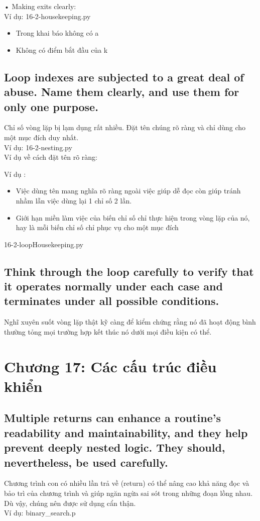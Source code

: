 \documentclass{article}
\begin{document}
    • Making exits clearly:\\
    Ví dụ: 16-2-housekeeping.py
    \begin{itemize}
        \item Trong khai báo không có a
        \item Không có điểm bắt đầu của k   
    \end{itemize}
    
    \subsection{Loop indexes are subjected to a great deal of abuse. Name them clearly, and use them for only one purpose.}
    Chỉ số vòng lặp bị lạm dụng rất nhiều. Đặt tên chúng rõ ràng và chỉ dùng cho một mục đích duy nhất.\\
    Ví dụ: 16-2-nesting.py\\
    Ví dụ về cách đặt tên rõ ràng: 
    
    Ví dụ :
    \begin{itemize}
        \item Việc dùng tên mang nghĩa rõ ràng ngoài việc giúp dễ đọc còn giúp tránh nhầm lẫn việc dùng lại 1 chỉ số 2 lần.
        \item Giới hạn miền làm việc của biến chỉ số chỉ thực hiện trong vòng lặp của nó, hay là mỗi biến chỉ số chỉ phục vụ cho một mục đích
    \end{itemize}
    16-2-loopHousekeeping.py
    
    \subsection{Think through the loop carefully to verify that it operates normally under each case and terminates under all possible conditions.}
    Nghĩ xuyên suốt vòng lặp thật kỹ càng để kiểm chứng rằng nó đã hoạt động bình thường tỏng mọi trường hợp kết thúc nó dưới mọi điều kiện có thể.
    

\section{Chương 17: Các cấu trúc điều khiển}
    \subsection{Multiple returns can enhance a routine's readability and maintainability, and they help prevent deeply nested logic. They should, nevertheless, be used carefully.}
    Chương trình con có nhiều lần trả về (return) có thể nâng cao khả năng đọc và bảo trì của chương trình và giúp ngăn ngừa sai sót trong những đoạn lồng nhau. Dù vậy, chúng nên được sử dụng cẩn thận.\\
    Ví dụ: binary_search.p
\end{document}
